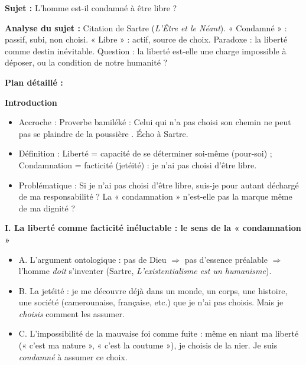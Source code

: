 \documentclass[11pt]{article}
\newcommand{\cle}[1]{{\popxbold\color{popdark}#1}}
\begin{document}
\begin{exoresolu}
\textbf{Sujet :} \guillemotleft L'homme est-il condamné à être libre ? \guillemotright

\medskip
\noindent\textbf{Analyse du sujet :} Citation de Sartre (\emph{L'Être et le Néant}). « Condamné » : passif, subi, non choisi. « Libre » : actif, source de choix. Paradoxe : la liberté comme destin inévitable. Question : la liberté est-elle une charge impossible à déposer, ou la condition de notre humanité ?

\tcblower

\textbf{Plan détaillé :}

\textbf{Introduction}
\begin{itemize}
\item Accroche : Proverbe bamiléké : \guillemotleft Celui qui n'a pas choisi son chemin ne peut pas se plaindre de la poussière \guillemotright. Écho à Sartre.
\item Définition : Liberté = capacité de se déterminer soi-même (pour-soi) ; Condamnation = facticité (jetéité) : je n'ai pas choisi d'être libre.
\item Problématique : Si je n'ai pas choisi d'être libre, suis-je pour autant déchargé de ma responsabilité ? La « condamnation » n'est-elle pas la marque même de ma dignité ?
\end{itemize}

\textbf{I. La liberté comme facticité inéluctable : le sens de la « condamnation »}
\begin{itemize}
\item A. L'argument ontologique : pas de Dieu $\Rightarrow$ pas d'essence préalable $\Rightarrow$ l'homme \emph{doit} s'inventer (Sartre, \emph{L'existentialisme est un humanisme}).
\item B. La \cle{jetéité} : je me découvre déjà dans un monde, un corps, une histoire, une société (camerounaise, française, etc.) que je n'ai pas choisis. Mais je \emph{choisis} comment les assumer.
\item C. L'impossibilité de la \cle{mauvaise foi} comme fuite : même en niant ma liberté (« c'est ma nature », « c'est la coutume »), je choisis de la nier. Je suis \emph{condamné} à assumer ce choix.
\end{itemize}


\end{exoresolu}
\end{document}
